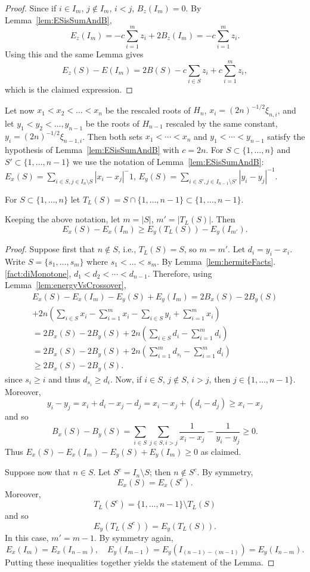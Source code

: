 \begin{proof}
    Since if $i\in I_m$, $j\notin I_m$, $i<j$, $B_z(I_m)=0$.  
    By Lemma~\ref{lem:ESisSumAndB}, $$E_z(I_m) = -c \sum_{i=1}^m z_i + 2 B_z(I_m) = -c \sum_{i=1}^m z_i.$$
    Using this and the same Lemma gives $$E_z(S)-E(I_m) = 2B(S) - c \sum_{i\in S} z_i + c \sum_{i=1}^m z_i,$$
    which is the claimed expression.
\end{proof}


Let now $x_1<x_2<\dots<x_n$ be the rescaled roots of $H_n$, $x_i = (2n)^{-1/2} \xi_{n,i}$, and let $y_1<y_2<\dots,y_{n-1}$ be the roots of $H_{n-1}$ rescaled by the same constant, $y_i = (2n)^{-1/2} \xi_{n-1,i}$.  Then both sets $x_1<\cdots<x_n$ and $y_1<\cdots<y_{n-1}$ satisfy the hypothesis of Lemma~\ref{lem:ESisSumAndB} with $c=2n$. For $S\subset\{1,\dots,n\}$ and $S'\subset\{1,\dots,n-1\}$ we use the notation of Lemma~\ref{lem:ESisSumAndB}: $E_x(S) = \sum_{i\in S, j\in I_n\setminus S} |x_i-x_j|^-1$, $E_y(S) = \sum_{i\in S', j\in I_{n-1}\setminus S'} |y_i-y_j|^{-1}$. 

For $S\subset\{1,\dots,n\}$ let $T_L(S) = S\cap \{1,\dots,n-1\} \subset \{1,\dots,n-1\}$.  

\begin{lemma} \label{lem:ExvsEy}
Keeping the above notation, let $m=|S|$, $m'=|T_L(S)|$.  Then  $$E_x(S)-E_x(I_m) \geq E_y(T_L(S))-E_y(I_{m'}).$$  
\end{lemma}
\begin{proof}
    Suppose first that $n\notin S$, i.e.,  $T_L(S) = S$, so $m=m'$.  Let $d_i = y_i-x_i$. Write $S=\{s_1,\dots,s_m\}$ where $s_1<\dots<s_m$.  By Lemma~\ref{lem:hermiteFacts}.\ref{fact:diMonotone}, $d_1<d_2<\cdots<d_{n-1}$.  Therefore, using Lemma~\ref{lem:energyVsCrossover},
    \begin{gather*}
        E_x(S)-E_x(I_m) - E_y(S) + E_y(I_m) = 2B_x(S)-2B_y(S)  \\
             + 2n\left( \sum_{i\in S } x_i - \sum_{i=1}^m x_i - \sum_{i\in S} y_i + \sum_{i=1}^m x_i  \right) \\
            = 2B_x(S)-2B_y(S) + 2n\left(\sum_{i\in S} d_i - \sum_{i=1}^m d_i \right) \\
            = 2B_x(S)-2B_y(S) + 2n\left(\sum_{i=1}^m d_{s_i} - \sum_{i=1}^m d_i \right) \\
            \geq 2B_x(S)-2B_y(S).
    \end{gather*}
    since $s_i\geq i$ and thus $d_{s_i}\geq d_i$. Now, if $i\in S$, $j\notin S$, $i>j$, then $j\in \{1,\dots,n-1\}$.  Moreover, $$y_i-y_j =x_i + d_i -x_j -d_j = x_i -x_j + (d_i-d_j)\geq x_i-x_j$$ and so
    $$B_x(S)-B_y(S)=\sum_{i\in S}\sum_{j\in S,i>j} \frac{1}{x_i-x_j} - \frac{1}{y_i-y_j}\geq 0. $$ Thus $E_x(S)-E_x(I_m) - E_y(S) + E_y(I_m)\geq 0$ as claimed.

    Suppose now that $n\in S$. Let $S^c = I_n \setminus S$; then $n\notin S^c$.  By symmetry, $$E_x(S)=E_x(S^c).$$ Moreover, $$T_L(S^c) = \{1,\dots,n-1\}\setminus T_L(S)$$ and so $$E_y(T_L(S^c))=E_y(T_L(S)).$$  In this case, $m'=m-1$. By symmetry again, $$E_x(I_m) = E_x(I_{n-m}),\quad  E_y(I_{m-1})=E_y(I_{(n-1)-(m-1)})=E_y(I_{n-m}). $$ Putting these inequalities together yields the statement of the Lemma.
\end{proof}

